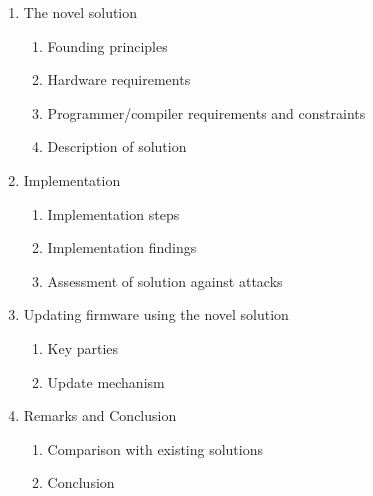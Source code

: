 \documentclass[10pt]{report}
\begin{document}
\begin{enumerate}
	\item The novel solution
		\begin{enumerate}[{6.}1]
			\item Founding principles
			\item Hardware requirements
			\item Programmer/compiler requirements and constraints
			\item Description of solution
		\end{enumerate}
	\item Implementation
		\begin{enumerate}[{7.}1]
			\item Implementation steps
			\item Implementation findings
			\item Assessment of solution against attacks
		\end{enumerate}
	\item Updating firmware using the novel solution
		\begin{enumerate}[{8.}1]
			\item Key parties
			\item Update mechanism
		\end{enumerate}
	\item Remarks and Conclusion
		\begin{enumerate}[{9.}1]
			\item Comparison with existing solutions
			\item Conclusion
		\end{enumerate}
\end{enumerate}

\end{document}
